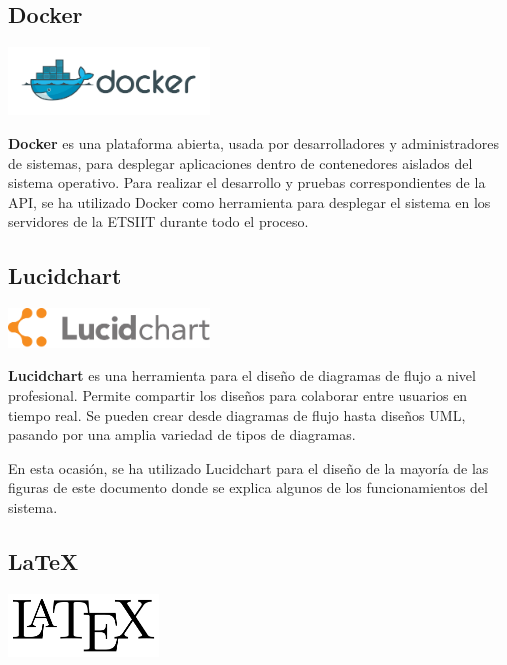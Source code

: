 \subsection{Docker}
\begin{minipage}{\textwidth}
	\centering
	\includegraphics[width=0.4\textwidth]{imagenes/docker_logo.png}\\[0.1cm]
\end{minipage}

\textbf{Docker} \cite{DockerInicial} es una plataforma abierta, usada por desarrolladores y administradores de sistemas, para desplegar aplicaciones dentro de contenedores aislados del sistema operativo.
Para realizar el desarrollo y pruebas correspondientes de la API, se ha utilizado Docker como herramienta para desplegar el sistema en los servidores de la ETSIIT durante todo el proceso.

\subsection{Lucidchart}
\begin{minipage}{\textwidth}
	\centering
	\includegraphics[width=0.4\textwidth]{imagenes/lucidchart_logo.png}\\[0.1cm]
\end{minipage}

\textbf{Lucidchart} \cite{LucidchartInicial} es una herramienta para el diseño de diagramas de flujo a nivel profesional. Permite compartir los diseños para colaborar entre usuarios en tiempo real. Se pueden crear desde diagramas de flujo hasta diseños UML, pasando por una amplia variedad de tipos de diagramas. 

En esta ocasión, se ha utilizado Lucidchart para el diseño de la mayoría de las figuras de este documento donde se explica algunos de los funcionamientos del sistema. 

\subsection{LaTeX}
\begin{minipage}{\textwidth}
	\centering
	\includegraphics[width=0.3\textwidth]{imagenes/latex_logo.png}\\[0.1cm]
\end{minipage}


